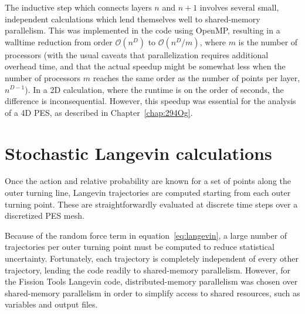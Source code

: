 The inductive step which connects layers $n$ and $n+1$ involves several small, independent calculations which lend themselves well to shared-memory parallelism. This was implemented in the code using OpenMP, resulting in a walltime reduction from order $\mathcal{O}(n^D)$ to $\mathcal{O}(n^D/m)$, where $m$ is the number of processors (with the usual caveats that parallelization requires additional overhead time, and that the actual speedup might be somewhat less when the number of processors $m$ reaches the same order as the number of points per layer, $n^{D-1}$). In a 2D calculation, where the runtime is on the order of seconds, the difference is inconsequential. However, this speedup was essential for the analysis of a 4D PES, as described in Chapter~\ref{chap:294Og}.


\section{Stochastic Langevin calculations}
Once the action and relative probability are known for a set of points along the outer turning line, Langevin trajectories are computed starting from each outer turning point. These are straightforwardly evaluated at discrete time steps over a discretized PES mesh.

Because of the random force term in equation~\eqref{eq:langevin}, a large number of trajectories per outer turning point must be computed to reduce statistical uncertainty. Fortunately, each trajectory is completely independent of every other trajectory, lending the code readily to shared-memory parallelism. However, for the Fission Tools Langevin code, distributed-memory parallelism was chosen over shared-memory parallelism in order to simplify access to shared resources, such as variables and output files.